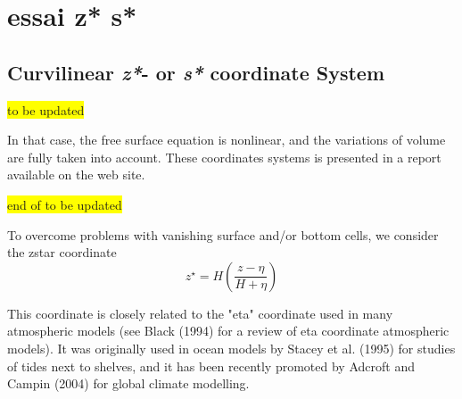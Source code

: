 \documentclass[NEMO_book]{subfiles}
\begin{document}
\chapter{ essai z* s*}
\section{Curvilinear \textit{z*}- or \textit{s*} coordinate System}


\colorbox{yellow}{ to be updated }

In that case, the free surface equation is nonlinear, and the variations of 
volume are fully taken into account. These coordinates systems is presented in 
a report \citep{Levier2007} available on the \NEMO web site. 

\colorbox{yellow}{  end of to be updated}
\newline


To overcome problems with vanishing surface and/or bottom cells, we consider the 
zstar coordinate 
\begin{equation} \label{PE_}
	z^\star = H \left( \frac{z-\eta}{H+\eta} \right)
\end{equation}

This coordinate is closely related to the "eta" coordinate used in many atmospheric 
models (see Black (1994) for a review of eta coordinate atmospheric models). It 
was originally used in ocean models by Stacey et al. (1995) for studies of tides 
next to shelves, and it has been recently promoted by Adcroft and Campin (2004) 
for global climate modelling.
\end{document}
